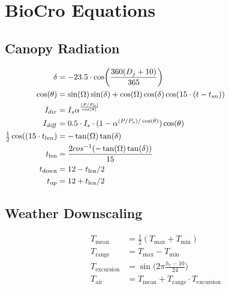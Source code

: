 \documentclass[10pt]{article}
\renewcommand{\marginnote}[2][]{}
\begin{document}
\section*{BioCro Equations}

\subsection*{Canopy Radiation}

\begin{align}
 \delta  &=  -23.5 \cdot \cos\biggl(\frac{360(D_{j}+10)}{365}\biggr) \hspace{2.5in} \label{eqn:delt} \\
 \cos(\theta)   &=  \sin(\Omega)\sin(\delta)+\cos(\Omega)\cos(\delta)\cos(15\cdot(t-t_{sn}))  \label{eqn:costheta}\\
 I_{dir}   &=  I_{s}\alpha^{\frac{(P/P_{o})}{\cos(\theta)}} \label{eqn:Idir}\\
 I_{\mathit{diff}}  &=   0.5 \cdot I_{s}\cdot(1-\alpha^{(P/P_{o})/\cos(\theta)})\cos(\theta) \\%
\tfrac{1}{2} \cos((15 \cdot t_{len})  &=  -\tan(\Omega)\tan(\delta) \label{eqn:costlen_old}  \\
t_\text{len} &= \frac{2cos^{-1}(-\tan(\Omega)\tan(\delta))}{15}\label{eqn:costlen} \label{eqn:tlen}\\
t_\text{down} &= 12-t_\text{len}/2\label{eqn:tdown}\\
t_\text{up} &= 12+t_\text{len}/2\label{eqn:tup}
\end{align}


\subsection*{Weather Downscaling}
\begin{align}
T_\text{mean} &= \frac{1}{2}\left(T_\text{max} + T_\text{min}\right)\label{eqn:Tmean}\\
T_\text{range} &= T_\text{max} - T_\text{min}\label{eqn:Trange}\\
T_\text{excursion}  &=  \sin\biggl(2 \pi \frac{h_{r}-10}{24}\biggr) \label{eqn:excur} \\
T_\text{air}  &=   T_\text{mean} + T_\text{range} \cdot T_\text{excursion} \label{eqn:Tair} 
\end{align}
\end{document}
